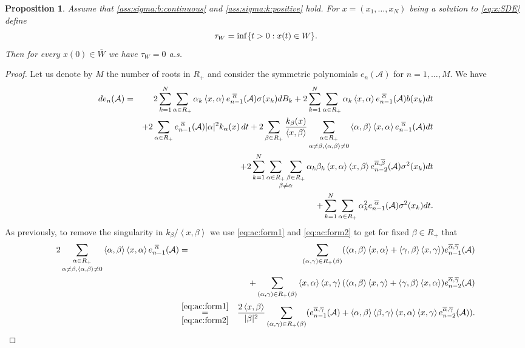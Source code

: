 \documentclass{article}
\numberwithin{equation}{section}
\newcommand{\C}{W}
\newcommand{\Cc}{\overline{W}}
\newcommand{\Aaclear}{\mathcal{A}}
\newcommand{\xa}{\left<x,\alpha\right>}
\newcommand{\xb}{\left<x,\beta\right>}
\newcommand{\xc}{\left<x,\gamma\right>}
\newcommand{\aR}{\alpha\in R_+}
\newcommand{\bR}{\beta\in R_+}
\newcommand{\ab}{\left<\alpha,\beta\right>}
\newcommand{\cb}{\left<\gamma,\beta\right>}
\newcommand{\bc}{\left<\beta,\gamma\right>}
\newcommand{\shift}{\,\,}
\newcommand{\eAc}[1]{e_{#1}(\Aaclear)}
\newcommand{\eaAc}[1]{e_{#1}^{\shift\overline{\alpha}}(\Aaclear)}
\newcommand{\eabAc}[1]{e_{#1}^{\overline{\alpha}, \overline{\beta}}(\Aaclear)}
\newcommand{\eacAc}[1]{e_{#1}^{\overline{\alpha}, \overline{\gamma}}(\Aaclear)}
\theoremstyle{plain}
\newtheorem{proposition}{Proposition}
\begin{document}
\begin{proposition}\label{pr:enteringW}
    Assume that \ref{ass:sigma:b:continuous} and \ref{ass:sigma:k:positive} hold. For $x=(x_1,\ldots,x_N)$ being a solution to \eqref{eq:x:SDE} define
    \begin{equation*}
        \tau_{\C} = \inf\{t>0: x(t)\in \C\}\/.
    \end{equation*}
    Then for every $x(0) \in \Cc$ we have $\tau_{\C} = 0$ a.s.
\end{proposition}
\begin{proof}
    Let us denote by $M$ the number of roots in $R_+$ and consider the symmetric polynomials $\eAc{n}$ for $n=1,\ldots,M$. We have
    \begin{eqnarray*}
        d\eAc{n} &=& 2\sum_{k=1}^N \sum_{\aR} \alpha_k \xa \eaAc{n-1}\sigma(x_k)dB_k
            +2\sum_{k=1}^N \sum_{\aR} \alpha_k \xa \eaAc{n-1} b(x_k)dt\\
        &&  +2\sum_{\aR}   \eaAc{n-1}|\alpha|^2 k_\alpha(x)\,dt + 2\sum_{\beta\in R_+} \frac{k_\beta(x)}{\xb} \mathop{\sum_{\aR}}_{\alpha \neq \beta , \ab\neq 0}\ab \xa \eaAc{n-1} dt \\
        &&  +2 \sum_{k=1}^N \mathop{\sum_{\aR}\sum_{\bR}}_{\beta\neq \alpha}\alpha_k\beta_k\xa\xb\eabAc{n-2}\sigma^2(x_k)dt \\
        &&  + \sum_{k=1}^N \sum_{\aR}\alpha_k^2 \eaAc{n-1}\sigma^2(x_k)dt\/. 
    \end{eqnarray*}
    As previously, to remove the singularity in $k_\beta/\xb$ we use \eqref{eq:ac:form1} and \eqref{eq:ac:form2} to get for fixed $\beta\in R_+$ that 
    \begin{eqnarray*}
        2 \mathop{\sum_{\aR}}_{\alpha \neq \beta , \ab\neq 0}\ab \xa \eaAc{n-1} &=&  \sum_{(\alpha,\gamma)\in R_+(\beta)}(\ab\xa+\cb\xc)\eacAc{n-1}\\
        &&+\sum_{(\alpha,\gamma)\in R_+(\beta)}\xa\xc(\ab\xc+\cb\xa)\eacAc{n-2}\\
        &\underset{\eqref{eq:ac:form2}}{\overset{\eqref{eq:ac:form1}}{=}}& \frac{2\xb}{|\beta|^2}\sum_{(\alpha,\gamma)\in R_+(\beta)} (\eacAc{n-1}+\ab\bc\xa\xc \eacAc{n-2}).
    \end{eqnarray*}
    

\end{proof}
\end{document}
